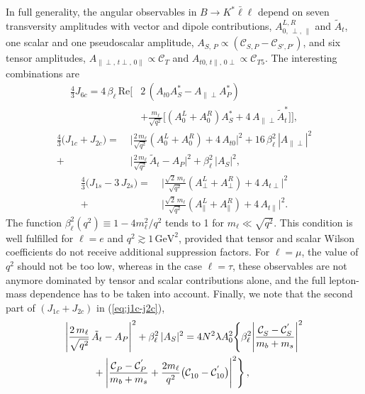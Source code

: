 \documentclass[twocolumn,epjc3]{svjour3}
\numberwithin{equation}{section}
\def \refeq#1{(\ref{#1})}
\newcommand{\wilson}[2][{}]{\mathcal{C}_{#2}^{\mathrm{#1}}}
\renewcommand{\[}{\big[}
\renewcommand{\]}{\big]}
\renewcommand{\(}{\big(}
\renewcommand{\)}{\big)}
\begin{document}
In full generality, the angular observables in $B\to K^* \bar\ell\ell$ depend on
seven transversity amplitudes with vector and dipole contributions,
$A_{0,\,\perp,\,\parallel}^{L,R}$ and $\tilde{A}_t$, one scalar and one
pseudoscalar amplitude, $A_{S,\,P} \propto (\wilson[]{S,P} - \wilson[]{S',P'})$,
and six tensor amplitudes, $A_{\parallel\perp,\,t\perp,\,0\parallel} \propto
\wilson[]{T}$ and $A_{t0,\,t\parallel,\,0\perp} \propto \wilson[]{T5}$.  The
interesting combinations are
\begin{align}
  \frac{4}{3} J_{6c}  =
  4\, \beta_\ell\, \mbox{Re} \bigg[ &2\, (A_{t0}^{} A_S^* - A_{\parallel\perp}^{} A_P^*) \nonumber\\
  &+ \frac{m_\ell}{\sqrt{q^2}} \big[(A_0^L + A_0^R) A_S^*
           + 4\, A_{\parallel\perp}^{} \tilde{A}_t^* \big] \bigg],
\end{align}
\begin{align}
  \label{eq:j1c-j2c}
  \frac{4}{3}\(J_{1c} + J_{2c}\) = \;
  &\Bigg| \frac{2\, m_\ell}{\sqrt{q^2}} (A_0^L + A_0^R) + 4\, A_{t0} \Bigg|^2    + 16\, \beta_\ell^2\, |A_{\parallel\perp}|^2 \nonumber\\
  + &\Bigg|\frac{2\, m_\ell}{\sqrt{q^2}}\, \tilde{A}_t - A_P\Bigg|^2 +
  \beta_\ell^2\, |A_S|^2,
 \end{align}
 \begin{align}
 \frac{4}{3}\(J_{1s} - 3\, J_{2s}\) = \;
    &\Bigg| \frac{\sqrt{2}\, m_\ell}{\sqrt{q^2}} (A_\perp^L + A_\perp^R) + 4\, A_{t\perp} \Bigg|^2 \nonumber\\
  + &\Bigg| \frac{\sqrt{2}\, m_\ell}{\sqrt{q^2}} (A_\parallel^L + A_\parallel^R) + 4\, A_{t\parallel} \Bigg|^2.
\end{align}
The function $\beta_\ell^2(q^2) \equiv 1 - 4 m_\ell^2/q^2$ tends to 1 for $m_\ell \ll
\sqrt{q^2}$.  This condition is well fulfilled for $\ell = e$ and $q^2 \gtrsim
1\, \mbox{GeV}^2$, provided that tensor and scalar Wilson coefficients do not
receive additional suppression factors. For $\ell = \mu$, the value of $q^2$
should not be too low, whereas in the case $\ell = \tau$, these observables are
not anymore dominated by tensor and scalar contributions alone, and the full
lepton-mass dependence has to be taken into account.  Finally, we note that the
second part of $(J_{1c} + J_{2c})$ in \refeq{eq:j1c-j2c},
\begin{align}
  &\Bigg|\frac{2\, m_\ell}{\sqrt{q^2}}\, \tilde{A}_t - A_P\Bigg|^2
   + \beta_\ell^2\, |A_S|^2   =  4 N^2 \lambda A_0^2 \Bigg\{
    \beta_\ell^2 \Bigg|\frac{\wilson[]{S} - \wilson[']{S}}{m_b + m_s}\Bigg|^2\nonumber\\
  &\hskip1cm + \Bigg|\frac{\wilson[]{P} - \wilson[']{P}}{m_b + m_s}
     + \frac{2 m_\ell}{q^2} \big(\wilson[]{10} - \wilson[']{10}\big) \Bigg|^2
    \Bigg\}\,,
\end{align}
\end{document}
